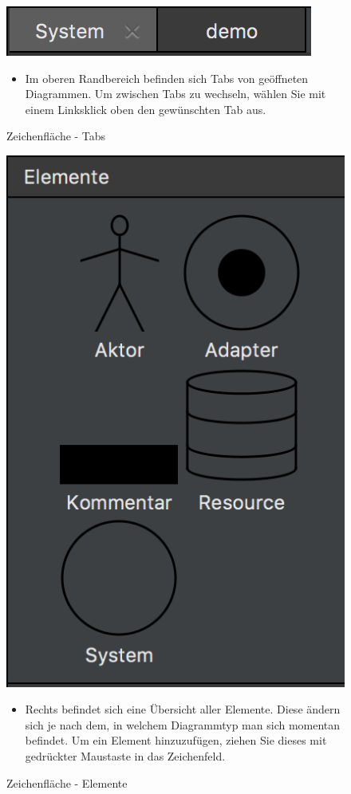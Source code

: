 \begin{figure}[h!]
	\centering
	\includegraphics[width=.4\textwidth]{Tabs.png}
	\caption{Zeichenfläche - Tabs}	
\begin{itemize}	
\item Im oberen Randbereich befinden sich Tabs von geöffneten Diagrammen. Um zwischen Tabs zu wechseln, wählen Sie mit einem Linksklick oben den gewünschten Tab aus.
\end{itemize}
\end{figure}

\begin{figure}[h!]
	\centering
	\includegraphics[width=.4\textwidth]{Elemente.png}
	\caption{Zeichenfläche - Elemente}	
\begin{itemize}	
\item Rechts befindet sich eine Übersicht aller Elemente. Diese ändern sich je nach dem, in welchem Diagrammtyp man sich momentan befindet. Um ein Element hinzuzufügen, ziehen Sie dieses mit gedrückter Maustaste in das Zeichenfeld. 
\end{itemize}
\end{figure}

